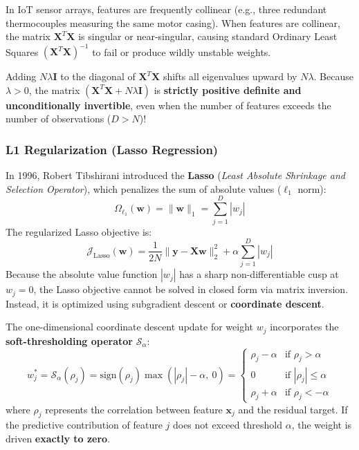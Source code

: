 \begin{keyidea}
In IoT sensor arrays, features are frequently collinear (e.g., three redundant thermocouples measuring the same motor casing). When features are collinear, the matrix $\mathbf{X}^T\mathbf{X}$ is singular or near-singular, causing standard Ordinary Least Squares $(\mathbf{X}^T\mathbf{X})^{-1}$ to fail or produce wildly unstable weights.

Adding $N\lambda \mathbf{I}$ to the diagonal of $\mathbf{X}^T\mathbf{X}$ shifts all eigenvalues upward by $N\lambda$. Because $\lambda > 0$, the matrix $(\mathbf{X}^T\mathbf{X} + N\lambda \mathbf{I})$ is \textbf{strictly positive definite and unconditionally invertible}, even when the number of features exceeds the number of observations ($D > N$)!
\end{keyidea}

\subsubsection{L1 Regularization (Lasso Regression)}

In 1996, Robert Tibshirani introduced the \textbf{Lasso} (\textit{Least Absolute Shrinkage and Selection Operator}), which penalizes the sum of absolute values ($\ell_1$ norm):
\begin{equation}
\Omega_{\ell_1}(\mathbf{w}) = \|\mathbf{w}\|_1 = \sum_{j=1}^D |w_j|\label{eq:l1_norm_def}
\end{equation}
The regularized Lasso objective is:
\begin{equation}
\mathcal{J}_{\text{Lasso}}(\mathbf{w}) = \frac{1}{2N} \|\mathbf{y} - \mathbf{X}\mathbf{w}\|_2^2 + \alpha \sum_{j=1}^D |w_j|\label{eq:lasso_objective}
\end{equation}
Because the absolute value function $|w_j|$ has a sharp non-differentiable cusp at $w_j = 0$, the Lasso objective cannot be solved in closed form via matrix inversion. Instead, it is optimized using subgradient descent or \textbf{coordinate descent}.

The one-dimensional coordinate descent update for weight $w_j$ incorporates the \textbf{soft-thresholding operator} $\mathcal{S}_{\alpha}$:
\begin{equation}
w_j^* = \mathcal{S}_{\alpha}(\rho_j) = \text{sign}(\rho_j) \max\left( |\rho_j| - \alpha, \ 0 \right) = 
\begin{cases}
\rho_j - \alpha & \text{if } \rho_j > \alpha \\
0 & \text{if } |\rho_j| \le \alpha \\
\rho_j + \alpha & \text{if } \rho_j < -\alpha
\end{cases}\label{eq:soft_thresholding}
\end{equation}
where $\rho_j$ represents the correlation between feature $\mathbf{x}_j$ and the residual target. If the predictive contribution of feature $j$ does not exceed threshold $\alpha$, the weight is driven \textbf{exactly to zero}.


